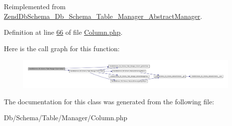 \-Reimplemented from \hyperlink{classZendDbSchema__Db__Schema__Table__Manager__AbstractManager_a2772bff0f798fb0be284a8e92d47a39e}{\-Zend\-Db\-Schema\-\_\-\-Db\-\_\-\-Schema\-\_\-\-Table\-\_\-\-Manager\-\_\-\-Abstract\-Manager}.



\-Definition at line \hyperlink{Manager_2Column_8php_source_l00066}{66} of file \hyperlink{Manager_2Column_8php_source}{\-Column.\-php}.



\-Here is the call graph for this function\-:\nopagebreak
\begin{figure}[H]
\begin{center}
\leavevmode
\includegraphics[width=350pt]{classZendDbSchema__Db__Schema__Table__Manager__Column_a2fe390d7ee88040f30bb31329d4ed5b9_cgraph}
\end{center}
\end{figure}




\-The documentation for this class was generated from the following file\-:\begin{DoxyCompactItemize}
\item 
\-Db/\-Schema/\-Table/\-Manager/\-Column.\-php\end{DoxyCompactItemize}
